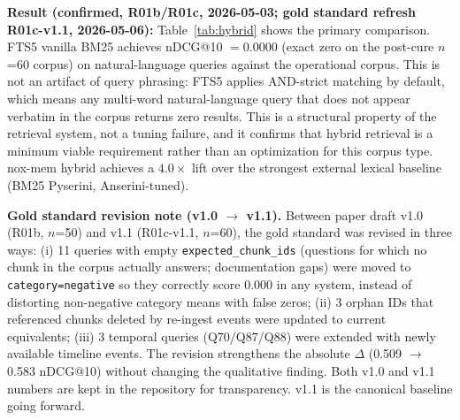 \textbf{Result (confirmed, R01b/R01c, 2026-05-03; gold standard refresh R01c-v1.1, 2026-05-06):} Table~\ref{tab:hybrid} shows the
primary comparison. FTS5 vanilla BM25 achieves nDCG@10 $= 0.0000$ (exact zero on the post-cure $n$=60 corpus) on
natural-language queries against the operational corpus. This is not an artifact of query
phrasing: FTS5 applies AND-strict matching by default, which means any multi-word
natural-language query that does not appear verbatim in the corpus returns zero results.
This is a structural property of the retrieval system, not a tuning failure, and it
confirms that hybrid retrieval is a minimum viable requirement rather than an optimization
for this corpus type. nox-mem hybrid achieves a $4.0\times$ lift over the strongest
external lexical baseline (BM25 Pyserini, Anserini-tuned).

\textbf{Gold standard revision note (v1.0 $\to$ v1.1).} Between paper draft v1.0 (R01b, $n$=50) and v1.1 (R01c-v1.1, $n$=60), the gold standard was revised in three ways: (i) 11 queries with empty \texttt{expected\_chunk\_ids} (questions for which no chunk in the corpus actually answers; documentation gaps) were moved to \texttt{category=negative} so they correctly score 0.000 in any system, instead of distorting non-negative category means with false zeros; (ii) 3 orphan IDs that referenced chunks deleted by re-ingest events were updated to current equivalents; (iii) 3 temporal queries (Q70/Q87/Q88) were extended with newly available timeline events. The revision strengthens the absolute $\Delta$ (0.509 $\to$ 0.583 nDCG@10) without changing the qualitative finding. Both v1.0 and v1.1 numbers are kept in the repository for transparency. v1.1 is the canonical baseline going forward.

